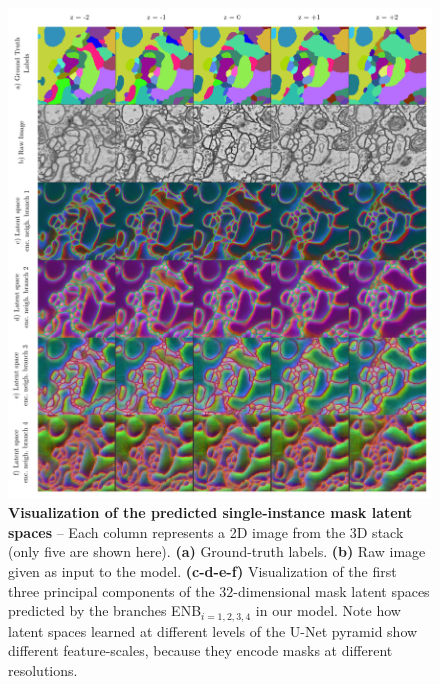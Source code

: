 \begin{figure}[tbp]
\centering
        \includegraphics[width=\textwidth]{./figures/LSIMasks/PCA_embeddings.pdf} %
        \vspace{1em}
        \caption{\textbf{Visualization of the predicted single-instance mask latent spaces} -- Each column represents a 2D image from the 3D stack (only five are shown here). \textbf{(a)} Ground-truth labels. \textbf{(b)} Raw image given as input to the model. \textbf{(c-d-e-f)} Visualization of the first three principal components of the $32$-dimensional mask latent spaces predicted by the \encBr branches ENB$_{i=1,2,3,4}$ in our model. Note how latent spaces learned at different levels of the U-Net pyramid show different feature-scales, because they encode \maskname masks at different resolutions.}
    \label{fig:PCA_embeddings}
\end{figure}



